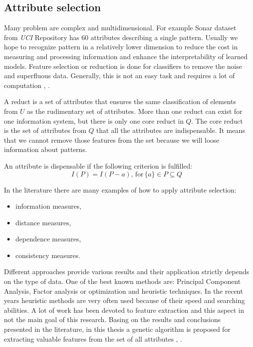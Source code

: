 \subsection{Attribute selection}
\label{cha:Attribute_reduction}
Many problem are complex and multidimensional. For example Sonar dataset from
\textit{UCI} Repository has 60 attributes describing a single pattern. 
Usually we hope to recognize pattern in a relatively
lower dimension to reduce the cost in measuring and processing information and
enhance the interpretability of learned models. Feature selection or reduction 
is done for classifiers to remove the noise and superfluous data. Generally,
this is not an easy task and requires a lot of computation \cite{bib1}, \cite{bib5}.  

A reduct is a set of attributes that ensures the same classification of
elements from $U$ as the rudimentary set of attributes. More than one reduct
can exist for one information system, but there is only one core reduct in $Q$.
The core reduct is the set of attributes from $Q$ that all the 
attributes are indispensable. It means that we cannot remove those features
from the set because we will loose information about patterns. 

An attribute is dispensable if the following criterion is fulfilled:
$$I(P) = I(P-{a}), \, \textrm{for} \, \{a\} \in P \subseteq  Q $$

In the literature there are many examples of how to apply attribute selection:
\begin{itemize}
    \item information measures,
    \item distance measures,
    \item dependence measures,
    \item consistency measures.
\end{itemize}
Different approaches provide various results and their application strictly
depends on the type of data. One of the best known methods are: Principal
Component Analysis, Factor analysis or optimization and heuristic techniques.
In the recent years heuristic methods are very often used because of their
speed and searching abilities. A lot of work has been devoted to feature
extraction and this aspect in not the main goal of this research.
Basing on the results and conclusions presented in the literature, in this thesis a 
genetic algorithm is proposed for extracting valuable features from the set of 
all attributes \cite{bib27}, \cite{bib48}.

